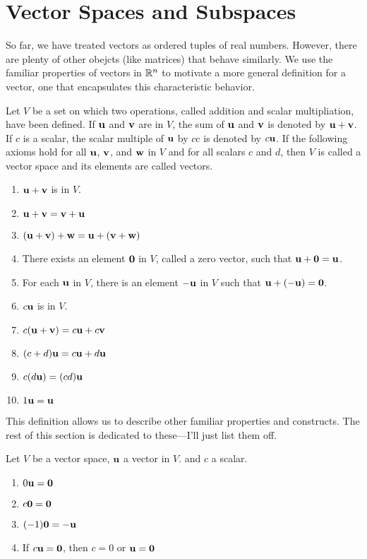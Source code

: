 \documentclass[../m73main.tex]{subfiles}
\begin{document}
\section{Vector Spaces and Subspaces}
So far, we have treated vectors as ordered tuples of real numbers.
However, there are plenty of other obejcts (like matrices) that behave similarly.
We use the familiar properties of vectors in $\mathbb{R}^n$ to motivate a more general definition for a vector, one that encapsulates this characteristic behavior.

\begin{definition}
	Let $V$ be a set on which two operations, called addition and scalar multipliation, have been defined.
	If $\mathbf{u}$ and $\mathbf{v}$ are in $V$, the sum of $\mathbf{u}$ and $\mathbf{v}$ is denoted by $\mathbf{u} + \mathbf{v}$.
	If $c$ is a scalar, the scalar multiple of $\mathbf{u}$ by $c$c is denoted by $c \mathbf{u}$.
	If the following axioms hold for all $\mathbf{u}$, $\mathbf{v}$, and $\mathbf{w}$ in $V$ and for all scalars $c$ and $d$, then $V$ is called a vector space and its elements are called vectors.
	\begin{enumerate}
		\item $\mathbf{u} + \mathbf{v}$ is in $V$.
		\item $\mathbf{u} + \mathbf{v} = \mathbf{v} + \mathbf{u}$
		\item $(\mathbf{u} + \mathbf{v}) + \mathbf{w} = \mathbf{u} + (\mathbf{v} + \mathbf{w})$
		\item There exists an element $\mathbf{0}$ in $V$, called a zero vector, such that $\mathbf{u} + \mathbf{0} = \mathbf{u}$.
		\item For each $\mathbf{u}$ in $V$, there is an element $-\mathbf{u}$ in $V$ such that $\mathbf{u} + (-\mathbf{u}) = \mathbf{0}$.
		\item $c \mathbf{u}$ is in $V$.
		\item $c(\mathbf{u} + \mathbf{v}) = c \mathbf{u} + c \mathbf{v}$
		\item $(c + d) \mathbf{u} = c \mathbf{u} + d \mathbf{u}$
		\item $c(d \mathbf{u}) = (cd) \mathbf{u}$
		\item $1 \mathbf{u} = \mathbf{u}$
	\end{enumerate}
\end{definition}

This definition allows us to describe other familiar properties and constructs.
The rest of this section is dedicated to these---I'll just list them off.

\begin{theorem}
	Let $V$ be a vector space, $\mathbf{u}$ a vector in $V$. and $c$ a scalar.
	\begin{enumerate}[label=(\alph*)]
		\item $0 \mathbf{u} = \mathbf{0}$
		\item $c \mathbf{0} = \mathbf{0}$
		\item $(-1) \mathbf{0} = -\mathbf{u}$
		\item If $c \mathbf{u} = \mathbf{0}$, then $c = 0$ or $\mathbf{u} = \mathbf{0}$
	\end{enumerate}
\end{theorem}
\end{document}
